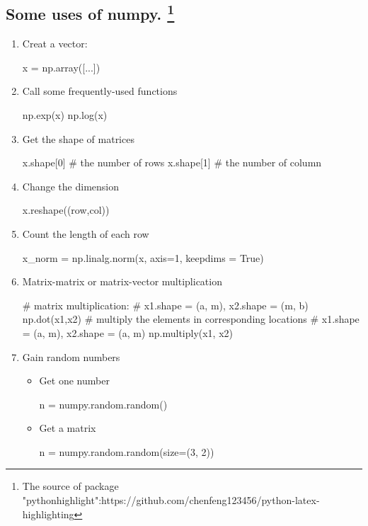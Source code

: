 \documentclass{article}
\begin{document}
\subsection{Some uses of numpy. \protect\footnote{The source of package "pythonhighlight":https://github.com/chenfeng123456/python-latex-highlighting}}
\begin{enumerate}
\item Creat a vector:
\begin{python}
x = np.array([...])
\end{python}

\item Call some frequently-used functions
\begin{python}
np.exp(x)
np.log(x)
\end{python}

\item Get the shape of matrices
\begin{python}[language=Python]
x.shape[0] # the number of rows
x.shape[1] # the number of column
\end{python}

\item Change the dimension
\begin{python}
x.reshape((row,col))
\end{python}

\item Count the length of each row
\begin{python}
x_norm = np.linalg.norm(x, axis=1, keepdims = True)
\end{python}

\item Matrix-matrix or matrix-vector multiplication
\begin{python}
# matrix multiplication: 
# x1.shape = (a, m), x2.shape = (m, b)
np.dot(x1,x2) 
# multiply the elements in corresponding locations
# x1.shape = (a, m), x2.shape = (a, m)
np.multiply(x1, x2) 
\end{python}

\item Gain random numbers

\begin{itemize}

\item Get one number
\begin{python}
n = numpy.random.random()
\end{python}

\item Get a matrix
\begin{python}
n = numpy.random.random(size=(3, 2))
\end{python}


\end{itemize}
\end{enumerate}
\end{document}
